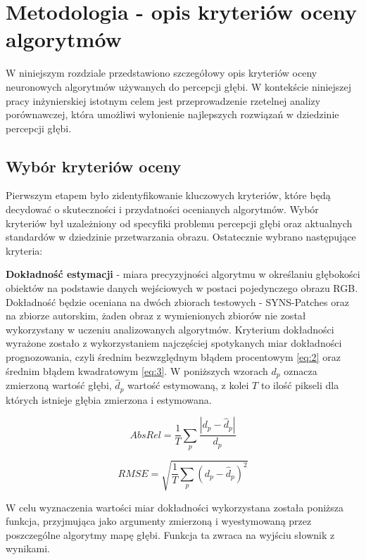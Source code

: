 \chapter{Metodologia - opis kryteriów oceny algorytmów}\label{chap:metodologia}

W niniejszym rozdziale przedstawiono szczegółowy opis kryteriów oceny neuronowych algorytmów używanych do percepcji głębi. W kontekście niniejszej pracy inżynierskiej istotnym celem jest przeprowadzenie rzetelnej analizy porównawczej, która umożliwi wyłonienie najlepszych rozwiązań w dziedzinie percepcji głębi.

\section{Wybór kryteriów oceny}
Pierwszym etapem było zidentyfikowanie kluczowych kryteriów, które będą decydować o skuteczności i przydatności ocenianych algorytmów. Wybór kryteriów był uzależniony od specyfiki problemu percepcji głębi oraz aktualnych standardów w dziedzinie przetwarzania obrazu. Ostatecznie wybrano następujące kryteria:

\textbf{Dokładność estymacji} - miara precyzyjności algorytmu w określaniu głębokości obiektów na podstawie danych wejściowych w postaci pojedynczego obrazu RGB. Dokładność będzie oceniana na dwóch zbiorach testowych - SYNS-Patches oraz na zbiorze autorskim, żaden obraz z wymienionych zbiorów nie został wykorzystany w uczeniu analizowanych algorytmów. Kryterium dokładności wyrażone zostało z wykorzystaniem najczęściej spotykanych miar dokładności prognozowania, czyli średnim bezwzględnym błądem procentowym \ref{eq:2} oraz średnim błądem kwadratowym \ref{eq:3}. W poniższych wzorach $ d_p $ oznacza zmierzoną wartość głębi, $ \hat{d}_p $ wartość estymowaną, z kolei $ T $ to ilość pikseli dla których istnieje głębia zmierzona i estymowana.

\begin{equation} \label{eq:2}
    AbsRel = \frac{1}{T} \sum_{p} \frac{|d_p - \hat{d}_p|}{d_p}
\end{equation}

\begin{equation} \label{eq:3}
    RMSE = \sqrt{\frac{1}{T} \sum_{p} (d_p - \hat{d}_p)^2}
\end{equation}

W celu wyznaczenia wartości miar dokładności wykorzystana została poniższa funkcja, przyjmująca jako argumenty zmierzoną i wyestymowaną przez poszczególne algorytmy mapę głębi. Funkcja ta zwraca na wyjściu słownik z wynikami.

